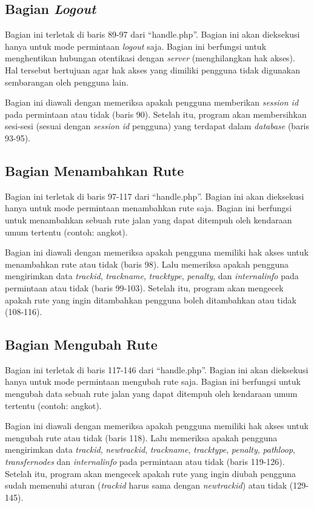 \subsection{Bagian \textit{Logout}}
\label{sec:bagianlogout}
Bagian ini terletak di baris 89-97 dari ``handle.php''. Bagian ini akan dieksekusi hanya untuk mode permintaan \textit{logout} saja. Bagian ini berfungsi untuk menghentikan hubungan otentikasi dengan \textit{server} (menghilangkan hak akses). Hal tersebut bertujuan agar hak akses yang dimiliki pengguna tidak digunakan sembarangan oleh pengguna lain.

Bagian ini diawali dengan memeriksa apakah pengguna memberikan \textit{session id} pada permintaan atau tidak (baris 90). Setelah itu, program akan membersihkan sesi-sesi (sesuai dengan \textit{session id} pengguna) yang terdapat dalam \textit{database} (baris 93-95).

\subsection{Bagian Menambahkan Rute}
\label{sec:menambahkanrute}
Bagian ini terletak di baris 97-117 dari ``handle.php''. Bagian ini akan dieksekusi hanya untuk mode permintaan menambahkan rute saja. Bagian ini berfungsi untuk menambahkan sebuah rute jalan yang dapat ditempuh oleh kendaraan umum tertentu (contoh: angkot).

Bagian ini diawali dengan memeriksa apakah pengguna memiliki hak akses untuk menambahkan rute atau tidak (baris 98). Lalu memeriksa apakah pengguna mengirimkan data \textit{trackid}, \textit{trackname}, \textit{tracktype}, \textit{penalty}, dan \textit{internalinfo} pada permintaan atau tidak (baris 99-103). Setelah itu, program akan mengecek apakah rute yang ingin ditambahkan pengguna boleh ditambahkan atau tidak (108-116).

\subsection{Bagian Mengubah Rute}
\label{sec:mengubahrute}
Bagian ini terletak di baris 117-146 dari ``handle.php''. Bagian ini akan dieksekusi hanya untuk mode permintaan mengubah rute saja. Bagian ini berfungsi untuk mengubah data sebuah rute jalan yang dapat ditempuh oleh kendaraan umum tertentu (contoh: angkot).

Bagian ini diawali dengan memeriksa apakah pengguna memiliki hak akses untuk mengubah rute atau tidak (baris 118). Lalu memeriksa apakah pengguna mengirimkan data \textit{trackid}, \textit{newtrackid}, \textit{trackname}, \textit{tracktype}, \textit{penalty}, \textit{pathloop}, \textit{transfernodes}  dan \textit{internalinfo} pada permintaan atau tidak (baris 119-126). Setelah itu, program akan mengecek apakah rute yang ingin diubah pengguna sudah memenuhi aturan (\textit{trackid} harus sama dengan \textit{newtrackid}) atau tidak (129-145).

